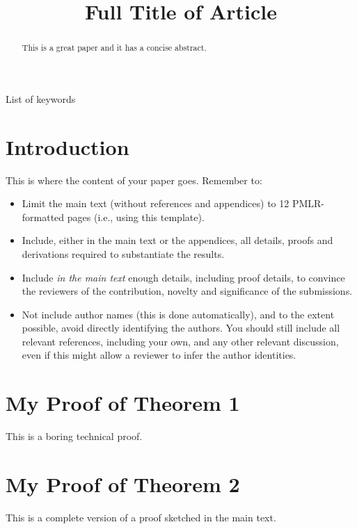 \documentclass[anon,12pt]{colt2018} %
\title[Short Title]{Full Title of Article}
\begin{document}
\maketitle

\begin{abstract}
This is a great paper and it has a concise abstract.
\end{abstract}

\begin{keywords}
List of keywords
\end{keywords}

\section{Introduction}

This is where the content of your paper goes.  Remember to:
\begin{itemize}
\item Limit the main text (without references and appendices) to 12 PMLR-formatted pages (i.e., using this template).
\item Include, either in the main text or the appendices, all details, proofs
  and derivations required to substantiate the results.
\item Include {\em in the main text} enough details, including proof
  details, to convince the reviewers of the contribution, novelty and significance of the submissions.
\item Not include author names (this is done automatically), and to
  the extent possible, avoid directly identifying the authors.  You
  should still include all relevant references, including your own,
  and any other relevant discussion, even if this might allow a
  reviewer to infer the author identities.
  \end{itemize}








\appendix

\section{My Proof of Theorem 1}

This is a boring technical proof.

\section{My Proof of Theorem 2}

This is a complete version of a proof sketched in the main text.
\end{document}
